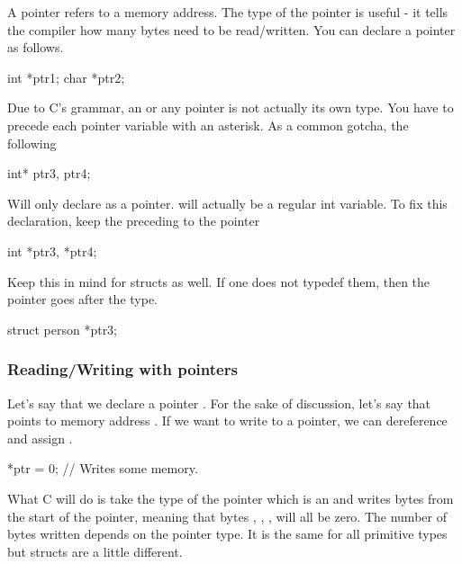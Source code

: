 A pointer refers to a memory address. The type of the pointer is useful
- it tells the compiler how many bytes need to be read/written. You can
declare a pointer as follows.

\begin{code}[language=C]
int *ptr1;
char *ptr2;
\end{code}

Due to C's grammar, an  or any pointer is not actually its
own type. You have to precede each pointer variable with an asterisk. As
a common gotcha, the following

\begin{code}[language=C]
int* ptr3, ptr4;
\end{code}

Will only declare  as a pointer.  will
actually be a regular int variable. To fix this declaration, keep the
\keyword{*} preceding to the pointer

\begin{code}[language=C]
int *ptr3, *ptr4;
\end{code}

Keep this in mind for structs as well. If one does not typedef them, then the pointer goes after the type.

\begin{code}[language=C]
struct person *ptr3;
\end{code}

\subsubsection{Reading/Writing with pointers}

Let's say that we declare a pointer . For the sake of
discussion, let's say that  points to memory address
. If we want to write to a pointer, we can dereference
and assign .

\begin{code}[language=C]
*ptr = 0; // Writes some memory.
\end{code}

What C will do is take the type of the pointer which is an 
and writes  bytes from the start of the pointer,
meaning that bytes , , ,
 will all be zero. The number of bytes written depends on
the pointer type. It is the same for all primitive types but structs are
a little different.

